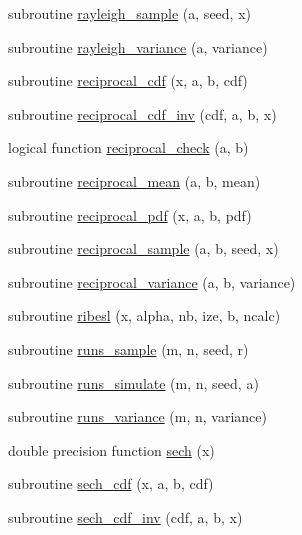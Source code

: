 \begin{DoxyCompactItemize}
subroutine \hyperlink{_bhabha__fortran__sem__doxy_8f_a37c29cebf26c80f5eca6d552281f6e4c}{rayleigh\+\_\+sample} (a, seed, x)
\item 
subroutine \hyperlink{_bhabha__fortran__sem__doxy_8f_a70e2c28fcfac69b8f4a5df3f1472fa15}{rayleigh\+\_\+variance} (a, variance)
\item 
subroutine \hyperlink{_bhabha__fortran__sem__doxy_8f_ae28b3530dc8de971f919080de1b93e80}{reciprocal\+\_\+cdf} (x, a, b, cdf)
\item 
subroutine \hyperlink{_bhabha__fortran__sem__doxy_8f_aa0605b5b606ef51bd36ef48ce4919924}{reciprocal\+\_\+cdf\+\_\+inv} (cdf, a, b, x)
\item 
logical function \hyperlink{_bhabha__fortran__sem__doxy_8f_af51dabb725b02ab97b328de46978219f}{reciprocal\+\_\+check} (a, b)
\item 
subroutine \hyperlink{_bhabha__fortran__sem__doxy_8f_ac0440a31997ff53e6f93ce9ee20af3ec}{reciprocal\+\_\+mean} (a, b, mean)
\item 
subroutine \hyperlink{_bhabha__fortran__sem__doxy_8f_a450f3e05aa915649721ddf2d61bf47fa}{reciprocal\+\_\+pdf} (x, a, b, pdf)
\item 
subroutine \hyperlink{_bhabha__fortran__sem__doxy_8f_abdaf248fa3bc68293411d44d881e2865}{reciprocal\+\_\+sample} (a, b, seed, x)
\item 
subroutine \hyperlink{_bhabha__fortran__sem__doxy_8f_a3c7e3917a239f43779f620c2e5863720}{reciprocal\+\_\+variance} (a, b, variance)
\item 
subroutine \hyperlink{_bhabha__fortran__sem__doxy_8f_a7388ce0c1e1baabe68d488afdddf9f76}{ribesl} (x, alpha, nb, ize, b, ncalc)
\item 
subroutine \hyperlink{_bhabha__fortran__sem__doxy_8f_a547f8f40db56f1abdf6d11537ff1ac85}{runs\+\_\+sample} (m, n, seed, r)
\item 
subroutine \hyperlink{_bhabha__fortran__sem__doxy_8f_a84945493088e8f98d15cf401c100e82c}{runs\+\_\+simulate} (m, n, seed, a)
\item 
subroutine \hyperlink{_bhabha__fortran__sem__doxy_8f_aa77c037b8f90a49ff7a1d9f4dde58aeb}{runs\+\_\+variance} (m, n, variance)
\item 
double precision function \hyperlink{_bhabha__fortran__sem__doxy_8f_a1749f7d18d74526e8948745e077f05d6}{sech} (x)
\item 
subroutine \hyperlink{_bhabha__fortran__sem__doxy_8f_ac322fce1f5c0595f018644a3a250015d}{sech\+\_\+cdf} (x, a, b, cdf)
\item 
subroutine \hyperlink{_bhabha__fortran__sem__doxy_8f_a48c395063f1fe4584b741fd7b8c20ca3}{sech\+\_\+cdf\+\_\+inv} (cdf, a, b, x)

\end{DoxyCompactItemize}
